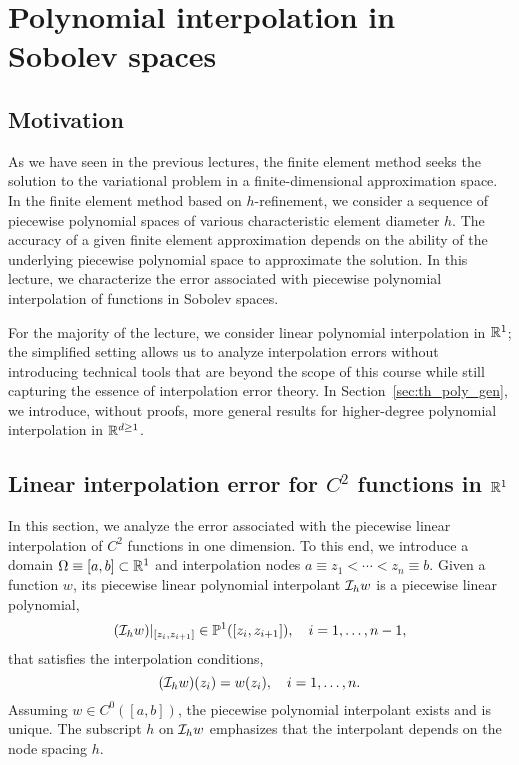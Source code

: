 \chapter{Polynomial interpolation in Sobolev spaces}

\section{Motivation}
As we have seen in the previous lectures, the finite element method seeks the solution to the variational problem in a finite-dimensional approximation space.  In the finite element method based on $h$-refinement, we consider a sequence of piecewise polynomial spaces of various characteristic element diameter $h$.  The accuracy of a given finite element approximation depends on the ability of the underlying piecewise polynomial space to approximate the solution.  In this lecture, we characterize the error associated with piecewise polynomial interpolation of functions in Sobolev spaces.

For the majority of the lecture, we consider linear polynomial interpolation in $\mathbb{R}^1$; the simplified setting allows us to analyze interpolation errors without introducing technical tools that are beyond the scope of this course while still capturing the essence of interpolation error theory. In Section~\ref{sec:th_poly_gen}, we introduce, without proofs, more general results for higher-degree polynomial interpolation in $\mathbb{R}^{d \geq 1}$.





\section{Linear interpolation error for $C^2$ functions in $\mathbb{R}^1$}

\label{sec:fe_interp_1d}
In this section, we analyze the error associated with the piecewise linear interpolation of $C^2$ functions in one dimension. To this end, we introduce a domain $\Omega \equiv [a,b] \subset \mathbb{R}^1$ and interpolation nodes $a \equiv z_1 < \cdots < z_n \equiv b$.  Given a function $w$, its piecewise linear polynomial interpolant $\mathcal{I}_h w$ is a piecewise linear polynomial,
\begin{equation*}
  (\mathcal{I}_h w)|_{[z_i,z_{i+1}]} \in \mathbb{P}^1([z_i,z_{i+1}]), \quad i = 1,\dots,n-1,
\end{equation*}
that satisfies the interpolation conditions,
\begin{equation*}
  (\mathcal{I}_h w)(z_i) = w(z_i), \quad i = 1,\dots,n.
\end{equation*}
Assuming $w \in C^0([a,b])$, the piecewise polynomial interpolant exists and is unique.  The subscript $h$ on $\mathcal{I}_h w$ emphasizes that the interpolant depends on the node spacing $h$.

